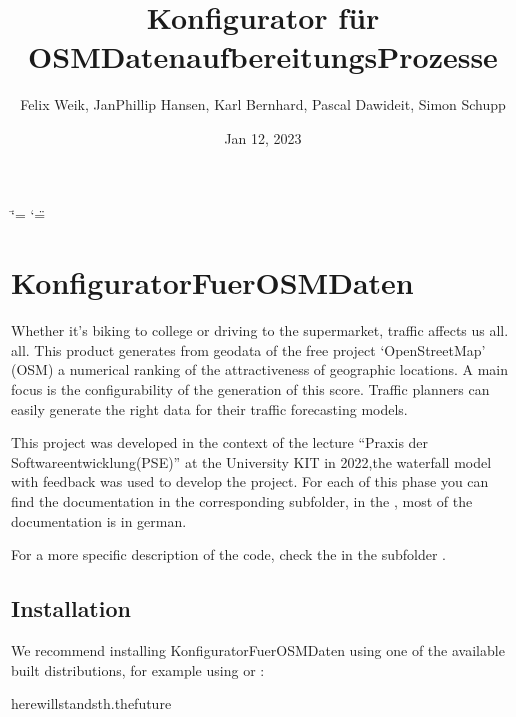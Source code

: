 \documentclass[letterpaper,10pt,english]{sphinxmanual}
\title{Konfigurator für OSM\sphinxhyphen{}Datenaufbereitungs\sphinxhyphen{}Prozesse}
\date{Jan 12, 2023}
\author{Felix Weik, Jan\sphinxhyphen{}Phillip Hansen, Karl Bernhard, Pascal Dawideit, Simon Schupp}
\begin{document}
\ifdefined\shorthandoff
  \ifnum\catcode`\=\string=\active\shorthandoff{=}\fi
  \ifnum\catcode`\"=\active{}\fi
\fi

\pagestyle{empty}
\sphinxmaketitle
\pagestyle{plain}
\sphinxtableofcontents
\pagestyle{normal}
\label{\detokenize{index::doc}}



\chapter{KonfiguratorFuerOSMDaten}
\label{\detokenize{index:konfiguratorfuerosmdaten}}

\sphinxAtStartPar
Whether it’s biking to college or driving to the supermarket, traffic
affects us all. all. This product generates from geodata of the free
project ‘OpenStreetMap’ (OSM) a numerical ranking of the
attractiveness of geographic locations. A main focus is the
configurability of the generation of this score. Traffic planners can
easily generate the right data for their traffic forecasting models.

\sphinxAtStartPar
{} 

\sphinxAtStartPar
This project was developed in the context of the lecture “Praxis der
Softwareentwicklung(PSE)” at the University KIT in 2022,the waterfall
model with feedback was used to develop the project.
For each of this phase you can find the documentation in the
corresponding subfolder, in the  , most of the documentation is in german.

\sphinxAtStartPar
For a more specific description of the code, check the  in
the subfolder .


\section{Installation}
\label{\detokenize{index:installation}}
\sphinxAtStartPar
We recommend installing KonfiguratorFuerOSMDaten
using one of the available built distributions,
for example using  or :

\begin{sphinxVerbatim}[commandchars=\\\{\}]
herewillstandsth.thefuture
\end{sphinxVerbatim}
\end{document}
